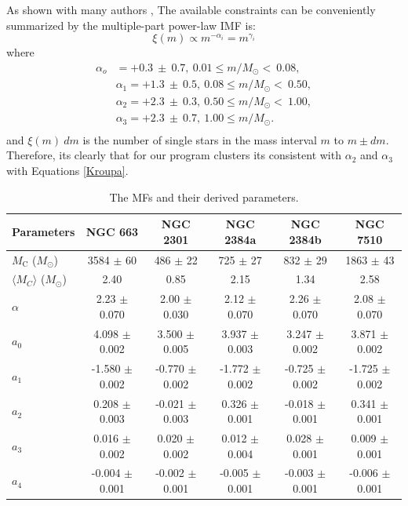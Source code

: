 \documentclass[referee]{raa}            %
\begin{document}
As shown with many authors \citep[e.g.,][]{2003PASP..115..763C, 2001MNRAS.322..231K, 1986FCPh...11....1S, 1979ApJS...41..513M}, The available constraints can be conveniently summarized by the multiple-part power-law IMF is:
\begin{equation}
    \xi(m) \propto m^{-\alpha_i}=m^{\gamma_i}
\end{equation}
where
\begin{equation}
\label{Kroupa}
\begin{split}
\alpha_o & = +0.3~\pm~0.7,~0.01 \le m/M_{\odot} <~0.08,  \\
&\alpha_1 = +1.3~\pm~0.5,~0.08 \le m/M_{\odot} <~0.50, \\
&\alpha_2  = +2.3~\pm~0.3,~0.50 \le m/M_{\odot} <~1.00, \\
&\alpha_3  = +2.3~\pm~0.7,~1.00 \le m/M_{\odot}. \\
\end{split}
\end{equation}
and $\xi(m)~dm$ is the number of single stars in the mass interval $m$ to
$m \pm dm$. Therefore, its clearly that for our program clusters its consistent with $\alpha_2$ and $\alpha_3$ with Equations \ref{Kroupa}.

\begin{table}[t]%
\centering
\caption{The MFs and their derived parameters.}
\begin{tabular}{l|ccccc}
\hline
\textbf{Parameters} & \textbf{NGC 663}  & \textbf{NGC 2301}  & \textbf{NGC 2384a} & \textbf{NGC 2384b} & \textbf{NGC 7510} \\
\hline
\hline
$M_{\text{C}}$ ($M_{\odot}$) & 3584 $\pm$ 60 & 486 $\pm$ 22  & 725 $\pm$ 27 & 832 $\pm$ 29 & 1863 $\pm$ 43   \\
$\langle M_C \rangle$ ($M_{\odot}$) & 2.40   & 0.85  & 2.15 & 1.34 & 2.58  \\
$\alpha$ & 2.23 $\pm$ 0.070  &  2.00 $\pm$ 0.030 & 2.12 $\pm$ 0.070 & 2.26 $\pm$ 0.070 & 2.08 $\pm$ 0.070  \\
$a_0$ &  4.098 $\pm$ 0.002  &  3.500 $\pm$ 0.005  & 3.937 $\pm$ 0.003 & 3.247 $\pm$ 0.002 & 3.871 $\pm$ 0.002 \\
$a_1$ & -1.580 $\pm$ 0.002  & -0.770 $\pm$ 0.002  & -1.772 $\pm$ 0.002 & -0.725 $\pm$ 0.002 & -1.725 $\pm$ 0.002\\
$a_2$ &  0.208 $\pm$ 0.003  & -0.021 $\pm$ 0.003  & 0.326 $\pm$ 0.001 & -0.018 $\pm$ 0.001 & 0.341 $\pm$ 0.001 \\
$a_3$ &  0.016 $\pm$ 0.002  &  0.020 $\pm$ 0.002  & 0.012 $\pm$ 0.004 & 0.028 $\pm$ 0.001 & 0.009 $\pm$ 0.001\\
$a_4$ & -0.004 $\pm$ 0.001  & -0.002 $\pm$ 0.001  & -0.005 $\pm$ 0.001 & -0.003 $\pm$ 0.001 & -0.006 $\pm$ 0.001\\
\hline
\end{tabular}
\label{MFs}
\end{table}
\end{document}
